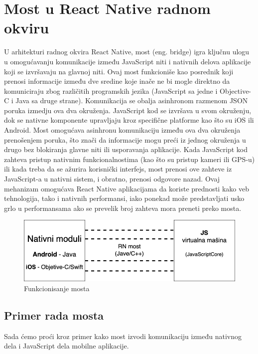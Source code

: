 \documentclass[12pt,oneside]{memoir}
\begin{document}
\section{Most u React Native radnom okviru}

U arhitekturi radnog okvira React Native, most (eng. bridge) igra ključnu ulogu u omogućavanju komunikacije između JavaScript niti i nativnih delova aplikacije koji se izvršavaju na glavnoj niti. Ovaj most funkcioniše kao posrednik koji prenosi informacije između dve sredine koje inače ne bi mogle direktno da komuniciraju zbog različitih programskih jezika (JavaScript sa jedne i Objective-C i Java sa druge strane). Komunikacija se obalja asinhronom razmenom JSON poruka izmedju ova dva okruženja. JavaScript kod se izvršava u svom okruženju, dok se nativne komponente upravljaju kroz specifične platforme kao što su iOS ili Android. Most omogućava asinhronu komunikaciju između ova dva okruženja prenošenjem poruka, što znači da informacije mogu preći iz jednog okruženja u drugo bez blokiranja glavne niti ili usporavanja aplikacije. Kada JavaScript kod zahteva pristup nativnim funkcionalnostima (kao što su pristup kameri ili GPS-u) ili kada treba da se ažurira korisnički interfejs, most prenosi ove zahteve iz JavaScript-a u nativni sistem, i obratno, prenosi odgovore nazad. Ovaj mehanizam omogućava React Native aplikacijama da koriste prednosti kako veb tehnologija, tako i nativnih performansi, iako ponekad može predstavljati usko grlo u performansama ako se prevelik broj zahteva mora preneti preko mosta.

\begin{figure}[h]
    \centering
    \includegraphics[scale=0.5]{docs/images/chapterThree/reactNativeBridge.png}
    \caption{Funkcionisanje mosta}
    \label{fig:reactNativeBridge}
\end{figure}

\subsection{Primer rada mosta}

Sada ćemo proći kroz primer kako most izvodi komunikaciju između nativnog dela i JavaScript dela mobilne aplikacije.
\end{document}
